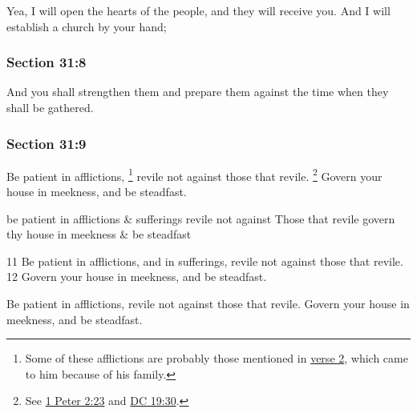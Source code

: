 		Yea, I will open the hearts of the people, and they will receive you. And I will establish a church by your hand;


	\subsubsection{Section 31:8} %
		\label{DC31-8}

		And you shall strengthen them and prepare them against the time when they shall be gathered.


	\subsubsection{Section 31:9} %
		\label{DC31-9}

		Be patient in afflictions,%
			\footnote{%
				Some of these afflictions are probably those mentioned in \hyperref[DC31-2]{verse 2}, which came to him because of his family.
				}
		revile not against those that revile.%
			\footnote{%
				See \hyperref[1PETER-2-23]{1 Peter 2:23} and \hyperref[DC19-30]{DC 19:30}.
				}
		Govern your house in meekness, and be steadfast.

		\begin{framed}
		\scriptsize
			\begin{compactdesc}
				\item[JSP] be patient in afflictions \& sufferings revile not against Those that revile govern thy house in meekness \& be steadfast
				\item[BC] 11 Be patient in afflictions, and in sufferings, revile not against those that revile. 12 Govern your house in meekness, and be steadfast.
				\item[DC 1835] Be patient in afflictions, revile not against those that revile. Govern your house in meekness, and be steadfast.
			\end{compactdesc}
		\end{framed}

